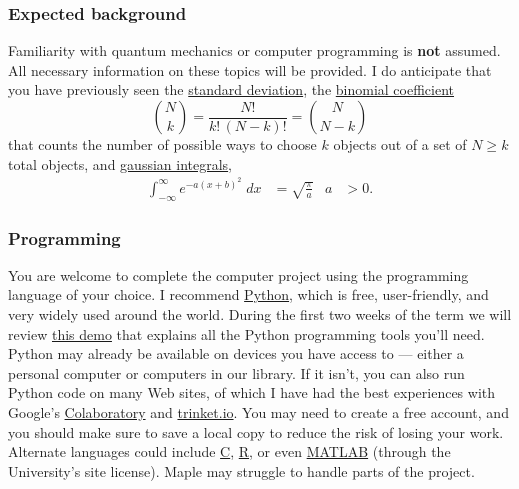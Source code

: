 \subsubsection*{Expected background}
Familiarity with quantum mechanics or computer programming is \textbf{not} assumed.
All necessary information on these topics will be provided.
I do anticipate that you have previously seen the \href{https://en.wikipedia.org/wiki/Standard_deviation}{standard deviation}, the \href{https://en.wikipedia.org/wiki/Binomial_coefficient}{binomial coefficient}
\begin{equation*}
  \binom{N}{k} = \frac{N!}{k! \, (N - k)!} = \binom{N}{N - k}
\end{equation*}
that counts the number of possible ways to choose $k$ objects out of a set of $N \geq k$ total objects, and \href{https://en.wikipedia.org/wiki/Gaussian_integral}{gaussian integrals},
\begin{align*} %
  \int_{-\infty}^{\infty} e^{-a (x + b)^2} \; dx & = \sqrt{\frac{\pi}{a}} &
  a & > 0.
\end{align*}

\subsubsection*{Programming}
You are welcome to complete the computer project using the programming language of your choice.
I recommend \href{https://www.python.org}{Python}, which is free, user-friendly, and very widely used around the world.
During the first two weeks of the term we will review \href{https://tinyurl.com/math327demo}{this demo} that explains all the Python programming tools you'll need.
Python may already be available on devices you have access to --- either a personal computer or computers in our library.
If it isn't, you can also run Python code on many Web sites, of which I have had the best experiences with Google's \href{https://colab.research.google.com}{Colaboratory}
and \href{https://trinket.io/python3}{trinket.io}. %
You may need to create a free account, and you should make sure to save a local copy to reduce the risk of losing your work.
Alternate languages could include \href{https://en.wikipedia.org/wiki/C_(programming_language)}{C}, \href{https://www.r-project.org}{R}, or even \href{https://matlab.mathworks.com}{MATLAB} (through the University's site license).
Maple may struggle to handle parts of the project.



